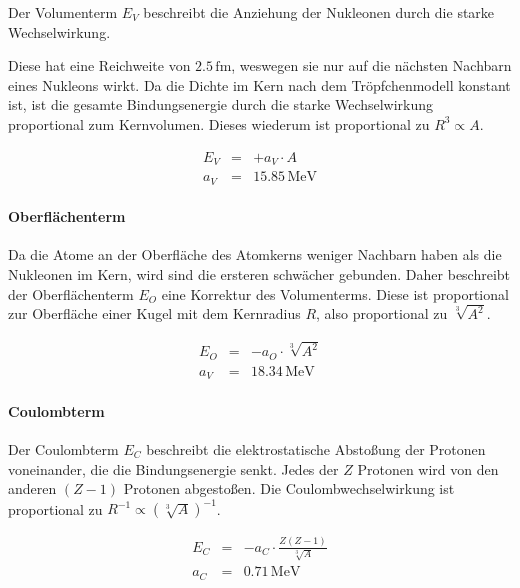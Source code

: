 \documentclass[12pt,a4paper]{scrartcl}
\numberwithin{equation}{section} %
\begin{document}
Der Volumenterm $E_V$ beschreibt die Anziehung der Nukleonen durch die starke Wechselwirkung.

Diese hat eine Reichweite von $2.5\mathrm{\,fm}$, weswegen sie nur auf die nächsten Nachbarn eines Nukleons wirkt. Da die Dichte im Kern nach dem Tröpfchenmodell konstant ist, ist die gesamte Bindungsenergie durch die starke Wechselwirkung proportional zum Kernvolumen. Dieses wiederum ist proportional zu $R^3\propto A$.

\begin{eqnarray}
    E_V &=& + a_V\cdot A \label{Volumenterm} \\
    a_V &=& 15.85\mathrm{\,MeV}
\end{eqnarray}

\hypertarget{oberfluxe4chenterm}{%
\paragraph{Oberflächenterm}\label{oberfluxe4chenterm}}

Da die Atome an der Oberfläche des Atomkerns weniger Nachbarn haben als die Nukleonen im Kern, wird sind die ersteren schwächer gebunden. Daher beschreibt der Oberflächenterm $E_O$ eine Korrektur des Volumenterms. Diese ist proportional zur Oberfläche einer Kugel mit dem Kernradius $R$, also proportional zu $\sqrt[3]{A^2}$.

\begin{eqnarray}
    E_O &=& - a_O\cdot \sqrt[3]{A^2} \label{Oberflächenterm} \\
    a_V &=& 18.34\mathrm{\,MeV}
\end{eqnarray}

\hypertarget{coulombterm}{%
\paragraph{Coulombterm}\label{coulombterm}}

Der Coulombterm $E_C$ beschreibt die elektrostatische Abstoßung der Protonen voneinander, die die Bindungsenergie senkt. Jedes der $Z$ Protonen wird von den anderen $(Z-1)$ Protonen abgestoßen. Die Coulombwechselwirkung ist proportional zu $R^{-1}\propto\left(\sqrt[3]{A}\right)^{-1}$.

\begin{eqnarray}
    E_C &=& - a_C\cdot \frac{Z(Z-1)}{\sqrt[3]{A}} \label{Coulombterm} \\
    a_C &=& 0.71\mathrm{\,MeV}
\end{eqnarray}
\end{document}
